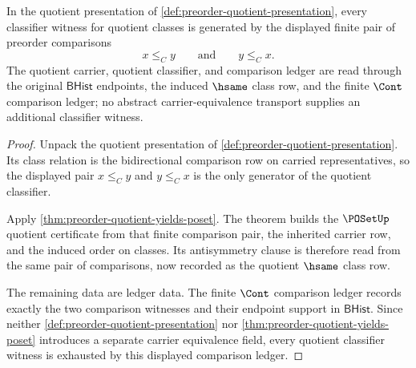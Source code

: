 \begin{theorem}
\label{thm:poset-quotient-classifier-exhaustion}
In the quotient presentation of \autoref{def:preorder-quotient-presentation},
every classifier witness for quotient classes is generated by the displayed
finite pair of preorder comparisons
$$
x\le_C y
\qquad\text{and}\qquad
y\le_C x.
$$
The quotient carrier, quotient classifier, and comparison ledger are read
through the original $\mathsf{BHist}$ endpoints, the induced $\hsame$ class
row, and the finite $\Cont$ comparison ledger; no abstract carrier-equivalence
transport supplies an additional classifier witness.
\end{theorem}
\begin{proof}
Unpack the quotient presentation of
\autoref{def:preorder-quotient-presentation}. Its class relation is the
bidirectional comparison row on carried representatives, so the displayed pair
$x\le_C y$ and $y\le_C x$ is the only generator of the quotient classifier.

Apply \autoref{thm:preorder-quotient-yields-poset}. The theorem builds the
$\POSetUp$ quotient certificate from that finite comparison pair, the inherited
carrier row, and the induced order on classes. Its antisymmetry clause is
therefore read from the same pair of comparisons, now recorded as the
quotient $\hsame$ class row.

The remaining data are ledger data. The finite $\Cont$ comparison ledger
records exactly the two comparison witnesses and their endpoint support in
$\mathsf{BHist}$. Since neither \autoref{def:preorder-quotient-presentation} nor
\autoref{thm:preorder-quotient-yields-poset} introduces a separate carrier
equivalence field, every quotient classifier witness is exhausted by this
displayed comparison ledger.
\end{proof}

